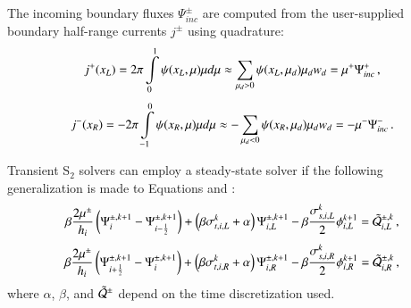 The incoming boundary fluxes $\Psi^\pm_{inc}$ are computed from the
user-supplied boundary half-range currents $j^\pm$ using quadrature:
\begin{equation}
   j^+(x_L) = 2\pi\int\limits_0^1 \psi(x_L,\mu)\mu d\mu
   \approx \sum\limits_{\mu_d>0}\psi(x_L,\mu_d)\mu_d w_d
   = \mu^+\Psi^+_{inc} \, ,
\end{equation}
\begin{equation}
   j^-(x_R) = -2\pi\int\limits_{-1}^0 \psi(x_R,\mu)\mu d\mu
   \approx -\sum\limits_{\mu_d<0}\psi(x_R,\mu_d)\mu_d w_d
   = -\mu^-\Psi^-_{inc} \, .
\end{equation}

Transient S$_2$ solvers can employ a steady-state solver if
the following generalization is made to Equations 
and :
\begin{equation}\lequ{S2trL}
  \beta\frac{2\mu^\pm}{h_i}\fn{\Psi^{\pm,k+1}_i - \Psi^{\pm,k+1}_{i-\half}}
  +\fn{\beta\sigma_{t,i,L}^k + \alpha}\Psi\iL^{\pm,k+1}
  -\beta\frac{\sigma_{s,i,L}^k}{2}\phi\iL^{k+1}
  =\tilde{\Q}_{i,L}^{\pm,k} \pec
\end{equation}
\begin{equation}\lequ{S2trR}
  \beta\frac{2\mu^\pm}{h_i}\fn{\Psi^{\pm,k+1}_{i+\half} - \Psi^{\pm,k+1}_i}
  +\fn{\beta\sigma_{t,i,R}^k + \alpha}\Psi\iR^{\pm,k+1}
  -\beta\frac{\sigma_{s,i,R}^k}{2}\phi\iR^{k+1}
  =\tilde{\Q}_{i,R}^{\pm,k} \pec
\end{equation}
where $\alpha$, $\beta$, and $\tilde{\mathcal{Q}}^\pm$ depend on the time
discretization used.

